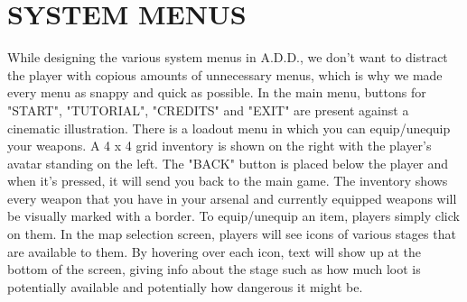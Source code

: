\documentclass{article}
\begin{document}
\section{SYSTEM MENUS \label{menus}}
While designing the various system menus in A.D.D., we don't want to distract the player with copious amounts of unnecessary menus, which is why we made every menu as snappy and quick as possible.
\bigbreak
In the main menu, buttons for "START", "TUTORIAL", "CREDITS" and "EXIT" are present against a cinematic illustration.
\bigbreak
There is a loadout menu in which you can equip/unequip your weapons. A 4 x 4 grid inventory is shown on the right with the player's avatar standing on the left. The "BACK" button is placed below the player and when it's pressed, it will send you back to the main game. The inventory shows every weapon that you have in your arsenal and currently equipped weapons will be visually marked with a border. To equip/unequip an item, players simply click on them.
\bigbreak
In the map selection screen, players will see icons of various stages that are available to them. By hovering over each icon, text will show up at the bottom of the screen, giving info about the stage such as how much loot is potentially available and potentially how dangerous it might be.
\end{document}
